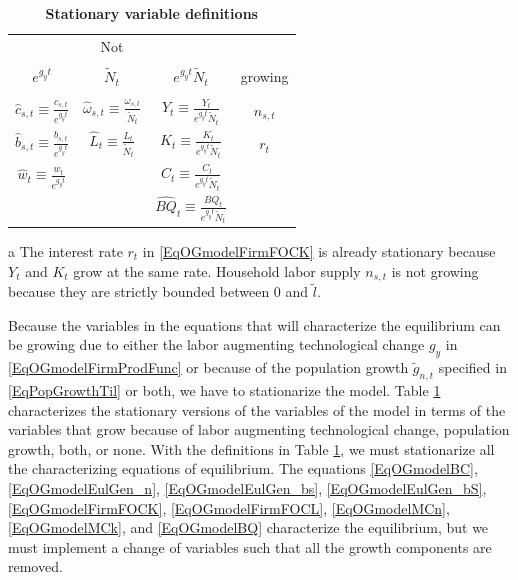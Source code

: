 \documentclass[letterpaper,12pt]{article}
\theoremstyle{definition}
\begin{document}
    \begin{table}[htbp] \centering \captionsetup{width=3.3in}
    \caption{\label{TabOGmodelStatVars}\textbf{Stationary variable definitions}}
      \begin{threeparttable}
      \begin{tabular}{>{\small}c >{\small}c >{\small}c |>{\small}c}
        \hline\hline
        \multicolumn{3}{c}{Sources of growth} & Not \\
        & & & \\[-4mm]
        $e^{g_y t}$ & $\tilde{N}_t$ & $e^{g_y t}\tilde{N}_t$ & growing\tnote{a} \\
        \hline
        & & \\[-4mm]
        $\hat{c}_{s,t}\equiv\frac{c_{s,t}}{e^{g_y t}}$ & $\hat{\omega}_{s,t}\equiv\frac{\omega_{s,t}}{\tilde{N}_t}$ & $\hat{Y}_t\equiv\frac{Y_t}{e^{g_y t}\tilde{N}_t}$ & $n_{s,t}$ \\[2mm]
        $\hat{b}_{s,t}\equiv\frac{b_{s,t}}{e^{g_y t}}$ & $\hat{L}_t\equiv\frac{L_t}{\tilde{N}_t}$ & $\hat{K}_t\equiv\frac{K_t}{e^{g_y t}\tilde{N}_t}$ & $r_t$ \\[2mm]
        $\hat{w}_t\equiv\frac{w_t}{e^{g_y t}}$ &  & $\hat{C}_{t}\equiv\frac{C_{t}}{e^{g_y t}\tilde{N}_t}$ &  \\[2mm]
        &  & $\hat{BQ}_t\equiv\frac{BQ_t}{e^{g_y t}\tilde{N}_t}$ &  \\
        \hline\hline
      \end{tabular}
      \begin{tablenotes}
        \scriptsize{\item[a]The interest rate $r_t$ in \eqref{EqOGmodelFirmFOCK} is already stationary because $Y_t$ and $K_t$ grow at the same rate. Household labor supply $n_{s,t}$ is not growing because they are strictly bounded between 0 and $\tilde{l}$.}
      \end{tablenotes}
      \end{threeparttable}
    \end{table}

    Because the variables in the equations that will characterize the equilibrium can be growing due to either the labor augmenting technological change $g_y$ in \eqref{EqOGmodelFirmProdFunc} or because of the population growth $\tilde{g}_{n,t}$ specified in \eqref{EqPopGrowthTil} or both, we have to stationarize the model. Table \ref{TabOGmodelStatVars} characterizes the stationary versions of the variables of the model in terms of the variables that grow because of labor augmenting technological change, population growth, both, or none. With the definitions in Table \ref{TabOGmodelStatVars}, we must stationarize all the characterizing equations of equilibrium. The equations \eqref{EqOGmodelBC}, \eqref{EqOGmodelEulGen_n}, \eqref{EqOGmodelEulGen_bs}, \eqref{EqOGmodelEulGen_bS}, \eqref{EqOGmodelFirmFOCK}, \eqref{EqOGmodelFirmFOCL}, \eqref{EqOGmodelMCn}, \eqref{EqOGmodelMCk}, and \eqref{EqOGmodelBQ} characterize the equilibrium, but we must implement a change of variables such that all the growth components are removed.
\end{document}
